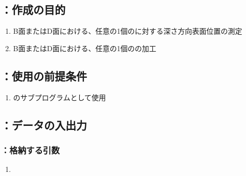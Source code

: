 \subsection{\DMLthreeBD：作成の目的}
\begin{enumerate}[label*=\sarrow]
\item B面またはD面における、任意の1個の\Dimple に対する深さ方向表面位置の測定
\item B面またはD面における、任意の1個の\Dimple の加工
\end{enumerate}


\subsection{\DMLthreeBD：使用の前提条件}
\begin{enumerate}[label*=\sarrow]
\item \DLtwoBD のサブプログラムとして使用
\end{enumerate}


\subsection{\DMLthreeBD：データの入出力}

\subsubsection{\DMLthreeBD：格納する引数}
\begin{enumerate}[label*=\sarrow]
\item \PMBDFaceSelectionFlag
\end{enumerate}

